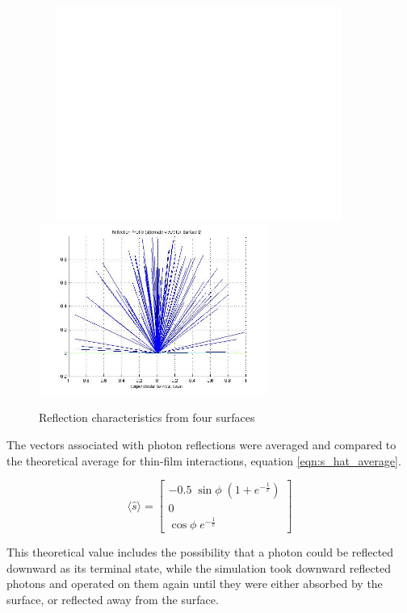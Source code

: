 \begin{description}
\begin{figure}[!ht]
        \includegraphics[width=105mm,height=70mm]{figs/blank.jpg}
        \includegraphics[width=75mm]{figs/sda/reflection5_sda.jpg}
        \caption{Reflection characteristics from four surfaces}
        \label{fig:ivv_surface_profiles}
      \end{figure}

      The vectors associated with photon reflections were averaged and
      compared to the theoretical average for thin-film
      interactions, equation \vref{eqn:s_hat_average}.

      \begin{equation*}
           \langle \hat{s}\rangle =\left[\begin{matrix}-0.5\;\sin \phi
           \;\left(1+e^{-\frac{1}{c}}\right)\\0\\\cos \phi
           \;e^{-\frac{1}{c}}\end{matrix}\right]
        \end{equation*}


      This theoretical value includes the possibility that a photon
      could be reflected downward as its terminal state, while the
      simulation took downward reflected photons and operated on them
      again until they were either absorbed by the surface, or
      reflected away from the surface.


\end{description}
